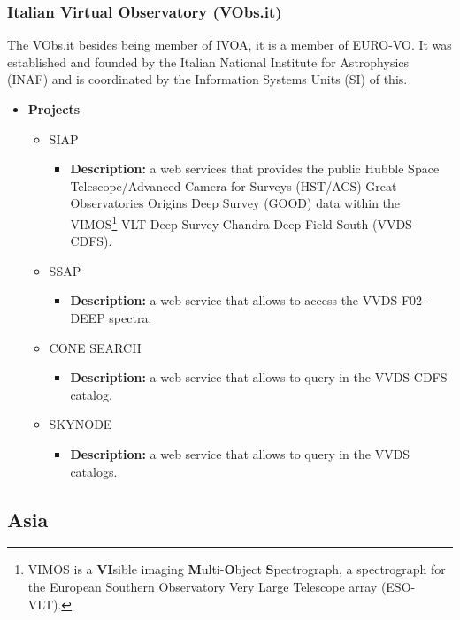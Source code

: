 \subsubsection{Italian Virtual Observatory (VObs.it)}
The VObs.it \cite{website:vobs.it-home} besides being member of IVOA, it is a
member of EURO-VO. It was established and founded by the Italian National
Institute for Astrophysics (INAF) and is coordinated by the Information Systems
Units (SI) of this. 

\begin{itemize}
\item \textbf{Projects}
\begin{itemize}
\item SIAP
\begin{itemize}
\item \textbf{Description:} a web services that provides the public Hubble Space
Telescope/Advanced Camera for Surveys (HST/ACS) Great Observatories Origins Deep
Survey (GOOD) data within the VIMOS\footnote{VIMOS is a \textbf{VI}sible imaging
\textbf{M}ulti-\textbf{O}bject \textbf{S}pectrograph, a spectrograph for the
European Southern Observatory Very Large Telescope array (ESO-VLT).}-VLT Deep
Survey-Chandra Deep Field South (VVDS-CDFS).
\end{itemize}
\item SSAP
\begin{itemize}
\item \textbf{Description:} a web service that allows to access the
VVDS-F02-DEEP spectra.
\end{itemize}
\item CONE SEARCH
\begin{itemize}
\item \textbf{Description:} a web service that allows to query in the VVDS-CDFS
catalog. 
\end{itemize}
\item SKYNODE
\begin{itemize}
\item \textbf{Description:} a web service that allows to query in the VVDS
catalogs. 
\end{itemize}
\end{itemize}
\end{itemize}

\subsection{Asia}
